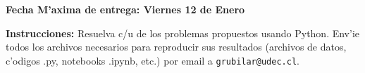 \documentclass[11pt]{exam}
\begin{document}
\firstpageheadrule
\runningheadrule
{}
\cfoot{ }
\begin{flushleft}
\vspace{0.2in}
\vspace{0.25cm}
\end{flushleft}

\begin{center}
\textbf{Fecha M'axima de entrega: Viernes 12 de Enero}
\end{center}
\textbf{Instrucciones:} Resuelva c/u de los problemas propuestos usando Python. Env'ie todos los archivos necesarios para reproducir sus resultados (archivos de datos, c'odigos .py, notebooks .ipynb, etc.) por email a \texttt{grubilar@udec.cl}.
\end{document}
